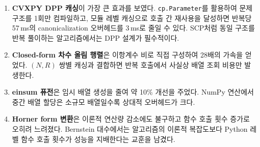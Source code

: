 \documentclass[11pt]{article}
\begin{document}
\begin{enumerate}
  \item \textbf{CVXPY DPP 캐싱}이 가장 큰 효과를 보였다.
    \texttt{cp.Parameter}를 활용하여 문제 구조를 1회만 컴파일하고,
    모듈 레벨 캐싱으로 호출 간 재사용을 달성하면
    반복당 57\,ms의 canonicalization 오버헤드를 3\,ms로 줄일 수 있다.
    SCP처럼 동일 구조를 반복 풀이하는 알고리즘에서는
    DPP 설계가 필수적이다.

  \item \textbf{Closed-form 차수 올림 행렬}은
    이항계수 비로 직접 구성하여 28배의 가속을 얻었다.
    $(N, R)$ 쌍별 캐싱과 결합하면 반복 호출에서
    사실상 배열 조회 비용만 발생한다.

  \item \textbf{einsum 퓨전}은 임시 배열 생성을 줄여 약 10\% 개선을 주었다.
    NumPy 연산에서 중간 배열 할당은 소규모 배열일수록
    상대적 오버헤드가 크다.

  \item \textbf{Horner form 변환}은 이론적 연산량 감소에도 불구하고
    함수 호출 횟수 증가로 오히려 느려졌다.
    Bernstein 대수에서는 알고리즘의 이론적 복잡도보다
    Python 레벨 함수 호출 횟수가 성능을 지배한다는 교훈을 남겼다.
\end{enumerate}




\end{document}
